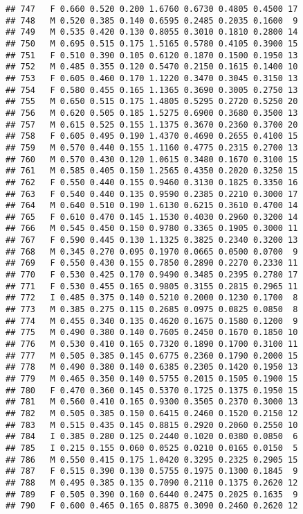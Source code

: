 \documentclass[
]{article}
\begin{document}
\begin{verbatim}
## 747   F 0.660 0.520 0.200 1.6760 0.6730 0.4805 0.4500 17
## 748   M 0.520 0.385 0.140 0.6595 0.2485 0.2035 0.1600  9
## 749   M 0.535 0.420 0.130 0.8055 0.3010 0.1810 0.2800 14
## 750   M 0.695 0.515 0.175 1.5165 0.5780 0.4105 0.3900 15
## 751   F 0.510 0.390 0.105 0.6120 0.1870 0.1500 0.1950 13
## 752   M 0.485 0.355 0.120 0.5470 0.2150 0.1615 0.1400 10
## 753   F 0.605 0.460 0.170 1.1220 0.3470 0.3045 0.3150 13
## 754   F 0.580 0.455 0.165 1.1365 0.3690 0.3005 0.2750 13
## 755   M 0.650 0.515 0.175 1.4805 0.5295 0.2720 0.5250 20
## 756   M 0.620 0.505 0.185 1.5275 0.6900 0.3680 0.3500 13
## 757   M 0.615 0.525 0.155 1.1375 0.3670 0.2360 0.3700 20
## 758   F 0.605 0.495 0.190 1.4370 0.4690 0.2655 0.4100 15
## 759   M 0.570 0.440 0.155 1.1160 0.4775 0.2315 0.2700 13
## 760   M 0.570 0.430 0.120 1.0615 0.3480 0.1670 0.3100 15
## 761   M 0.585 0.405 0.150 1.2565 0.4350 0.2020 0.3250 15
## 762   F 0.550 0.440 0.155 0.9460 0.3130 0.1825 0.3350 16
## 763   F 0.540 0.440 0.135 0.9590 0.2385 0.2210 0.3000 17
## 764   M 0.640 0.510 0.190 1.6130 0.6215 0.3610 0.4700 14
## 765   F 0.610 0.470 0.145 1.1530 0.4030 0.2960 0.3200 14
## 766   M 0.545 0.450 0.150 0.9780 0.3365 0.1905 0.3000 11
## 767   F 0.590 0.445 0.130 1.1325 0.3825 0.2340 0.3200 13
## 768   M 0.345 0.270 0.095 0.1970 0.0665 0.0500 0.0700  9
## 769   F 0.550 0.430 0.155 0.7850 0.2890 0.2270 0.2330 11
## 770   F 0.530 0.425 0.170 0.9490 0.3485 0.2395 0.2780 17
## 771   F 0.530 0.455 0.165 0.9805 0.3155 0.2815 0.2965 11
## 772   I 0.485 0.375 0.140 0.5210 0.2000 0.1230 0.1700  8
## 773   M 0.385 0.275 0.115 0.2685 0.0975 0.0825 0.0850  8
## 774   M 0.455 0.340 0.135 0.4620 0.1675 0.1580 0.1200  9
## 775   M 0.490 0.380 0.140 0.7605 0.2450 0.1670 0.1850 10
## 776   M 0.530 0.410 0.165 0.7320 0.1890 0.1700 0.3100 11
## 777   M 0.505 0.385 0.145 0.6775 0.2360 0.1790 0.2000 15
## 778   M 0.490 0.380 0.140 0.6385 0.2305 0.1420 0.1950 13
## 779   M 0.465 0.350 0.140 0.5755 0.2015 0.1505 0.1900 15
## 780   F 0.470 0.360 0.145 0.5370 0.1725 0.1375 0.1950 15
## 781   M 0.560 0.410 0.165 0.9300 0.3505 0.2370 0.3000 13
## 782   M 0.505 0.385 0.150 0.6415 0.2460 0.1520 0.2150 12
## 783   M 0.515 0.435 0.145 0.8815 0.2920 0.2060 0.2550 10
## 784   I 0.385 0.280 0.125 0.2440 0.1020 0.0380 0.0850  6
## 785   I 0.215 0.155 0.060 0.0525 0.0210 0.0165 0.0150  5
## 786   M 0.550 0.415 0.175 1.0420 0.3295 0.2325 0.2905 15
## 787   F 0.515 0.390 0.130 0.5755 0.1975 0.1300 0.1845  9
## 788   M 0.495 0.385 0.135 0.7090 0.2110 0.1375 0.2620 12
## 789   F 0.505 0.390 0.160 0.6440 0.2475 0.2025 0.1635  9
## 790   F 0.600 0.465 0.165 0.8875 0.3090 0.2460 0.2620 12

\end{verbatim}
\end{document}
